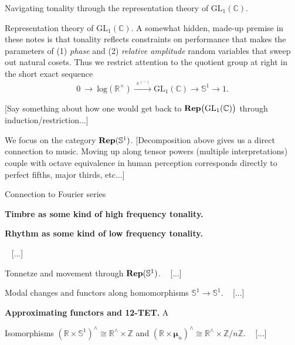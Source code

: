 \documentclass[letterpaper,11pt, reqno]{amsart}
\newtheorem{monodromy theorem}{Monodromy Theorem}[subsection]
\newtheorem{wild conjecture}[theorem]{Wild Conjecture}
\newtheorem{research objectives}{Research objectives}[subsection]
\newtheorem{research question}[theorem]{Research questions}
\newtheorem{aside question}[theorem]{Aside question}
\newtheorem{audio example}[theorem]{\loudspeaker[3] Example}
\newtheorem{blank remark}[theorem]{}
\newtheorem{terminology and comment}[theorem]{Terminology and comment}
\newtheorem{purity hypothesis}[theorem]{Purity hypothesis}
\newtheorem{corollary of the purity hypothesis}[theorem]{Corollary of the purity hypothesis}
\newcommand{\CC} {{\mathbb C}}
\newcommand{\RR} {{\mathbb R}}
\newcommand{\ZZ} {{\mathbb Z}}
\newcommand{\lra}{{\longrightarrow}}
\numberwithin{equation}{theorem}
\begin{document}
\begin{section}{Navigating tonality through the representation theory of $\text{GL}_{1}(\CC)$.}
\begin{subsection}{Representation theory of $\text{GL}_{1}(\CC)$.}
A somewhat hidden, made-up premise in these notes is that tonality reflects constraints on performance that makes the parameters of (1) {\em phase} and (2) {\em relative amplitude} random variables that sweep out natural cosets. Thus we restrict attention to the quotient group at right in the short exact sequence
	$$
	0
	\ \lra\ 
	\text{log}(\RR^\times)\xrightarrow{\ \ e^{(-)}\ }
	\text{GL}_{1}(\CC)
	\lra
	\mathbb{S}^{1}
	\lra
	1.
	$$

{\color{red} [Say something about how one would get back to $\bold{Rep}\big(\text{GL}_{1}(\CC)\big)$ through induction/restriction...]}

	We focus on the category $\bold{Rep}(\mathbb{S}^{1})$. {\color{red} [Decomposition above gives us a direct connection to music. Moving up along tensor powers (multiple interpretations) couple with octave equivalence in human perception corresponds directly to perfect fifths, major thirds, etc...]}
\end{subsection}

\begin{subsection}{Connection to Fourier series}
\ 	
\begin{subsubsection}
\normalfont
{\bf Timbre as some kind of high frequency tonality.}
\end{subsubsection}

\begin{subsubsection}
\normalfont
{\bf Rhythm as some kind of low frequency tonality.}
\end{subsubsection}

\ {\color{red} [...]}
\end{subsection}

\begin{subsection}{Tonnetze and movement through $\bold{Rep}(\mathbb{S}^{1})$.}
\ {\color{red} [...]}
\end{subsection}

\begin{subsection}{Modal changes and functors along homomorphisms $\mathbb{S}^{1}\longrightarrow\mathbb{S}^{1}$.}
\ {\color{red} [...]}

\begin{subsubsection}
\normalfont
{\bf Approximating functors and 12-TET.}
A
\end{subsubsection}

\begin{subsection}{Isomorphisms $(\RR\!\times\!\mathbb{S}^{1})^\wedge\cong\RR^\wedge\!\times\!\ZZ$ and $(\RR\!\times\!\pmb{\mu}_{n})^\wedge\cong\RR^\wedge\!\times\!\ZZ/n\ZZ$.}
\ {\color{red} [...]}

\end{subsection}

\end{subsection}

\end{section}
\end{document}

